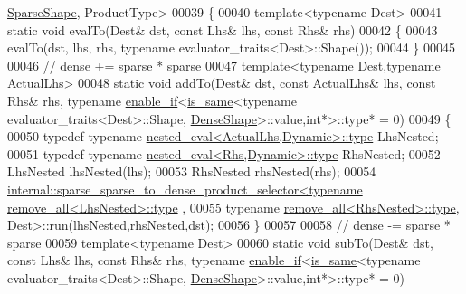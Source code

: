 \begin{DoxyCode}
      \hyperlink{struct_eigen_1_1_sparse_shape}{SparseShape}, ProductType>
00039 \{
00040   \textcolor{keyword}{template}<\textcolor{keyword}{typename} Dest>
00041   \textcolor{keyword}{static} \textcolor{keywordtype}{void} evalTo(Dest& dst, \textcolor{keyword}{const} Lhs& lhs, \textcolor{keyword}{const} Rhs& rhs)
00042   \{
00043     evalTo(dst, lhs, rhs, \textcolor{keyword}{typename} evaluator\_traits<Dest>::Shape());
00044   \}
00045 
00046   \textcolor{comment}{// dense += sparse * sparse}
00047   \textcolor{keyword}{template}<\textcolor{keyword}{typename} Dest,\textcolor{keyword}{typename} ActualLhs>
00048   \textcolor{keyword}{static} \textcolor{keywordtype}{void} addTo(Dest& dst, \textcolor{keyword}{const} ActualLhs& lhs, \textcolor{keyword}{const} Rhs& rhs, \textcolor{keyword}{typename} 
      \hyperlink{struct_eigen_1_1internal_1_1enable__if}{enable\_if}<\hyperlink{struct_eigen_1_1internal_1_1is__same}{is\_same}<\textcolor{keyword}{typename} evaluator\_traits<Dest>::Shape,
      \hyperlink{struct_eigen_1_1_dense_shape}{DenseShape}>::value,\textcolor{keywordtype}{int}*>::type* = 0)
00049   \{
00050     \textcolor{keyword}{typedef} \textcolor{keyword}{typename} \hyperlink{class_eigen_1_1internal_1_1_tensor_lazy_evaluator_writable}{nested\_eval<ActualLhs,Dynamic>::type} LhsNested;
00051     \textcolor{keyword}{typedef} \textcolor{keyword}{typename} \hyperlink{class_eigen_1_1internal_1_1_tensor_lazy_evaluator_writable}{nested\_eval<Rhs,Dynamic>::type} RhsNested;
00052     LhsNested lhsNested(lhs);
00053     RhsNested rhsNested(rhs);
00054     
      \hyperlink{struct_eigen_1_1internal_1_1sparse__sparse__to__dense__product__selector}{internal::sparse\_sparse\_to\_dense\_product\_selector<typename remove\_all<LhsNested>::type}
      ,
00055                                                       \textcolor{keyword}{typename} 
      \hyperlink{group___sparse_core___module}{remove\_all<RhsNested>::type}, Dest>::run(lhsNested,rhsNested,dst);
00056   \}
00057 
00058   \textcolor{comment}{// dense -= sparse * sparse}
00059   \textcolor{keyword}{template}<\textcolor{keyword}{typename} Dest>
00060   \textcolor{keyword}{static} \textcolor{keywordtype}{void} subTo(Dest& dst, \textcolor{keyword}{const} Lhs& lhs, \textcolor{keyword}{const} Rhs& rhs, \textcolor{keyword}{typename} 
      \hyperlink{struct_eigen_1_1internal_1_1enable__if}{enable\_if}<\hyperlink{struct_eigen_1_1internal_1_1is__same}{is\_same}<\textcolor{keyword}{typename} evaluator\_traits<Dest>::Shape,
      \hyperlink{struct_eigen_1_1_dense_shape}{DenseShape}>::value,\textcolor{keywordtype}{int}*>::type* = 0)

\end{DoxyCode}

